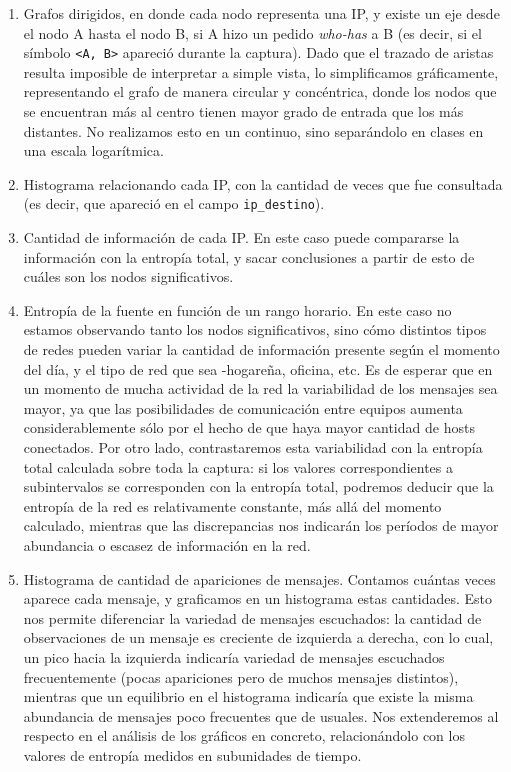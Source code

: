 \begin{enumerate}
 \item Grafos dirigidos, en donde cada nodo representa una IP, y existe un eje desde el nodo A hasta el nodo B, si A hizo un pedido \emph{who-has} a B (es decir, si el s\'imbolo \texttt{<A, B>} apareci\'o durante la captura). Dado que el trazado de aristas resulta imposible de interpretar a simple vista, lo simplificamos gráficamente, representando el grafo de manera circular y concéntrica, donde los nodos que se encuentran más al centro tienen mayor grado de entrada que los más distantes. No realizamos esto en un continuo, sino separándolo en clases en una escala logarítmica.
 \item Histograma relacionando cada IP, con la cantidad de veces que fue consultada (es decir, que apareci\'o en el campo \texttt{ip\_destino}).
 \item Cantidad de informaci\'on de cada IP. En este caso puede compararse la informaci\'on con la entrop\'ia total, y sacar conclusiones a partir de esto de cu\'ales son los nodos significativos.
 
 \item Entrop\'ia de la fuente en funci\'on de un rango horario. En este caso no estamos observando tanto los nodos significativos, sino c\'omo distintos tipos de redes pueden variar la cantidad de informaci\'on presente seg\'un el momento del d\'ia, y el tipo de red que sea -hogare\~na, oficina, etc. Es de esperar que en un momento de mucha actividad de la red la variabilidad de los mensajes sea mayor, ya que las posibilidades de comunicación entre equipos aumenta considerablemente sólo por el hecho de que haya mayor cantidad de hosts conectados. Por otro lado, contrastaremos esta variabilidad con la entropía total calculada sobre toda la captura: si los valores correspondientes a subintervalos se corresponden con la entropía total, podremos deducir que la entropía de la red es relativamente constante, más allá del momento calculado, mientras que las discrepancias nos indicarán los períodos de mayor abundancia o escasez de información en la red.
 
 \item Histograma de cantidad de apariciones de mensajes. Contamos cuántas veces aparece cada mensaje, y graficamos en un histograma estas cantidades. Esto nos permite diferenciar la variedad de mensajes escuchados: la cantidad de observaciones de un mensaje es creciente de izquierda a derecha, con lo cual, un pico hacia la izquierda indicaría variedad de mensajes escuchados frecuentemente (pocas apariciones pero de muchos mensajes distintos), mientras que un equilibrio en el histograma indicaría que existe la misma abundancia de mensajes poco frecuentes que de usuales. Nos extenderemos al respecto en el análisis de los gráficos en concreto, relacionándolo con los valores de entropía medidos en subunidades de tiempo.
 
\end{enumerate}


